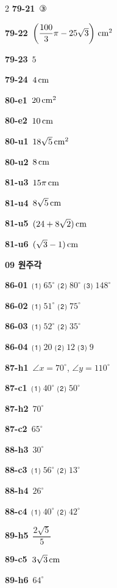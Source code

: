 \documentclass[10pt,a4paper]{article}
\begin{document}
\begin{multicols}{2}
\noindent\textbf{79-21}\ ③\par
\noindent\textbf{79-22}\ $\left(\dfrac{100}{3}\pi-25\sqrt{3}\right)\mkern3mu \mathrm{cm}^2$\par
\noindent\textbf{79-23}\ $5$\par
\noindent\textbf{79-24}\ $4\mkern3mu \mathrm{cm}$\par
\noindent\textbf{80-e1}\ $20\mkern3mu \mathrm{cm}^2$\par
\noindent\textbf{80-e2}\ $10\mkern3mu \mathrm{cm}$\par
\noindent\textbf{80-u1}\ $18\sqrt{5}\mkern3mu \mathrm{cm}^2$\par
\noindent\textbf{80-u2}\ $8\mkern3mu \mathrm{cm}$\par
\noindent\textbf{81-u3}\ $15\pi\mkern3mu \mathrm{cm}$\par
\noindent\textbf{81-u4}\ $8\sqrt{5}\mkern3mu \mathrm{cm}$\par
\noindent\textbf{81-u5}\ $(24+8\sqrt{2})\mkern3mu \mathrm{cm}$\par
\noindent\textbf{81-u6}\ $(\sqrt{3}-1)\mkern3mu \mathrm{cm}$\par
\noindent\textbf{09 원주각}\par\smallskip
\noindent\textbf{86-01}\ ⑴ $65^\circ$ ⑵ $80^\circ$ ⑶ $148^\circ$\par
\noindent\textbf{86-02}\ ⑴ $51^\circ$ ⑵ $75^\circ$\par
\noindent\textbf{86-03}\ ⑴ $52^\circ$ ⑵ $35^\circ$\par
\noindent\textbf{86-04}\ ⑴ $20$ ⑵ $12$ ⑶ $9$\par
\noindent\textbf{87-h1}\ $\angle x=70^\circ$, $\angle y=110^\circ$\par
\noindent\textbf{87-c1}\ ⑴ $40^\circ$ ⑵ $50^\circ$\par
\noindent\textbf{87-h2}\ $70^\circ$\par
\noindent\textbf{87-c2}\ $65^\circ$\par
\noindent\textbf{88-h3}\ $30^\circ$\par
\noindent\textbf{88-c3}\ ⑴ $56^\circ$ ⑵ $13^\circ$\par
\noindent\textbf{88-h4}\ $26^\circ$\par
\noindent\textbf{88-c4}\ ⑴ $40^\circ$ ⑵ $42^\circ$\par
\noindent\textbf{89-h5}\ $\dfrac{2\sqrt{5}}{5}$\par
\noindent\textbf{89-c5}\ $3\sqrt{3}\mkern3mu \mathrm{cm}$\par
\noindent\textbf{89-h6}\ $64^\circ$\par

\end{multicols}
\end{document}
